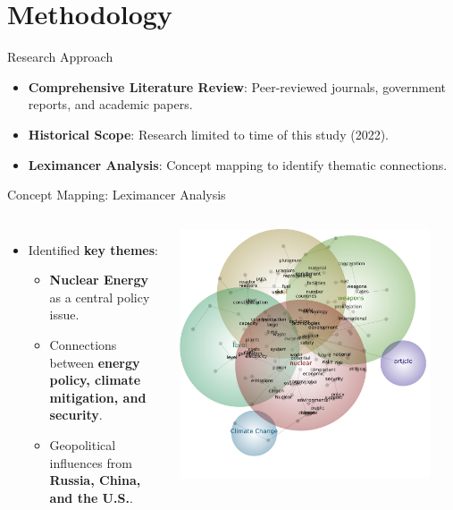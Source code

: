 \documentclass{beamer}
\begin{document}
\section{Methodology}
\begin{frame}{Research Approach}
    \begin{itemize}
        \item \textbf{Comprehensive Literature Review}: Peer-reviewed journals, government reports, and academic papers.
        \item \textbf{Historical Scope}: Research limited to time of this study (2022).
        \item \textbf{Leximancer Analysis}: Concept mapping to identify thematic connections.
    \end{itemize}
\end{frame}


\begin{frame}{Concept Mapping: Leximancer Analysis}
    \begin{columns}
        \begin{itemize}
            \item Identified \textbf{key themes}:
            \begin{itemize}
                \item \textbf{Nuclear Energy} as a central policy issue.
                \item Connections between \textbf{energy policy, climate mitigation, and security}.
                \item Geopolitical influences from \textbf{Russia, China, and the U.S.}.
            \end{itemize}
        \end{itemize}
        
        \centering
        \includegraphics[width=0.9\textwidth]{Images/E Nexus-concept-map.jpeg} %
    \end{columns}
\end{frame}
\end{document}
